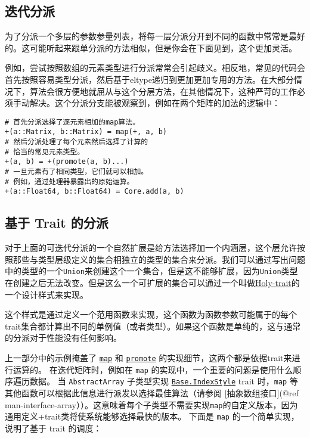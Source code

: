 \hypertarget{6940352566710127049}{}


\subsection{迭代分派}



为了分派一个多层的参数参量列表，将每一层分派分开到不同的函数中常常是最好的。这可能听起来跟单分派的方法相似，但是你会在下面见到，这个更加灵活。



例如，尝试按照数组的元素类型进行分派常常会引起歧义。相反地，常见的代码会首先按照容易类型分派，然后基于eltype递归到更加更加专用的方法。在大部分情况下，算法会很方便地就屈从与这个分层方法，在其他情况下，这种严苛的工作必须手动解决。这个分派分支能被观察到，例如在两个矩阵的加法的逻辑中：




\begin{verbatim}
# 首先分派选择了逐元素相加的map算法。
+(a::Matrix, b::Matrix) = map(+, a, b)
# 然后分派处理了每个元素然后选择了计算的
# 恰当的常见元素类型。
+(a, b) = +(promote(a, b)...)
# 一旦元素有了相同类型，它们就可以相加。
# 例如，通过处理器暴露出的原始运算。
+(a::Float64, b::Float64) = Core.add(a, b)
\end{verbatim}



\hypertarget{5085783943422577248}{}


\subsection{基于 Trait 的分派}



对于上面的可迭代分派的一个自然扩展是给方法选择加一个内涵层，这个层允许按照那些与类型层级定义的集合相独立的类型的集合来分派。我们可以通过写出问题中的类型的一个\texttt{Union}来创建这个一个集合，但是这不能够扩展，因为\texttt{Union}类型在创建之后无法改变。但是这么一个可扩展的集合可以通过一个叫做\href{https://github.com/JuliaLang/julia/issues/2345\#issuecomment-54537633}{{\textquotedbl}Holy-trait{\textquotedbl}}的一个设计样式来实现。



这个样式是通过定义一个范用函数来实现，这个函数为函数参数可能属于的每个trait集合都计算出不同的单例值（或者类型）。如果这个函数是单纯的，这与通常的分派对于性能没有任何影响。



上一部分中的示例掩盖了 \hyperlink{11483231213869150535}{\texttt{map}} 和 \hyperlink{1760874576431605095}{\texttt{promote}} 的实现细节，这两个都是依据trait来进行运算的。 在迭代矩阵时，例如在 \texttt{map} 的实现中，一个重要的问题是使用什么顺序遍历数据。 当 \texttt{AbstractArray} 子类型实现 \hyperlink{7782790551324367092}{\texttt{Base.IndexStyle}} trait 时，\texttt{map} 等其他函数可以根据此信息进行派发以选择最佳算法（请参阅 [抽象数组接口](@ref man-interface-array））。这意味着每个子类型不需要实现\texttt{map}的自定义版本，因为通用定义+trait类将使系统能够选择最快的版本。 下面是 \texttt{map} 的一个简单实现，说明了基于 trait 的调度：




